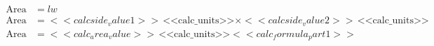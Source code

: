 \hfill
\begin{minipage}{.4\textwidth}
  \begin{align*}
  \text{Area} &= lw \\
  \text{Area} &= <<calcside_value1>> \,\text{<<calc_units>>} \times <<calcside_value2>> \,\text{<<calc_units>>} \\
  \text{Area} &= <<calc_area_value>> \,\text{<<calc_units>>}<<calc_formula_part1>>
  \end{align*}
\end{minipage}

